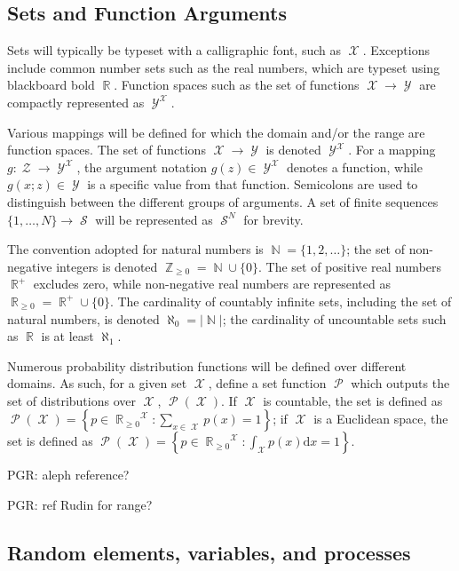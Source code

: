 \documentclass[12pt]{report}
\DeclareMathOperator{\Xcal}{\mathcal{X}}
\DeclareMathOperator{\Ycal}{\mathcal{Y}}
\DeclareMathOperator{\Zcal}{\mathcal{Z}}
\DeclareMathOperator{\Scal}{\mathcal{S}}
\DeclareMathOperator{\Pcal}{\mathcal{P}}
\DeclareMathOperator{\Rbb}{\mathbb{R}}
\DeclareMathOperator{\Nbb}{\mathbb{N}}
\DeclareMathOperator{\Zbb}{\mathbb{Z}}
\begin{document}
\subsection*{Sets and Function Arguments}

Sets will typically be typeset with a calligraphic font, such as $\Xcal$. Exceptions include common number sets such as the real numbers, which are typeset using blackboard bold $\Rbb$. Function spaces such as the set of functions $\Xcal \to \Ycal$ are compactly represented as $\Ycal^{\Xcal}$.

Various mappings will be defined for which the domain and/or the range are function spaces. The set of functions $\Xcal \to \Ycal$ is denoted $\Ycal^{\Xcal}$. For a mapping $g : \Zcal \to \Ycal^{\Xcal}$, the argument notation $g(z) \in \Ycal^{\Xcal}$ denotes a function, while $g(x;z) \in \Ycal$ is a specific value from that function. Semicolons are used to distinguish between the different groups of arguments. A set of finite sequences $\{1,\ldots,N\} \to \Scal$ will be represented as $\Scal^N$ for brevity.

The convention adopted for natural numbers is $\Nbb = \{1,2,\ldots\}$; the set of non-negative integers is denoted $\Zbb_{\geq 0} = \Nbb \cup \{0\}$. The set of positive real numbers $\Rbb^+$ excludes zero, while non-negative real numbers are represented as $\Rbb_{\geq 0} = \Rbb^+ \cup \{0\}$. The cardinality of countably infinite sets, including the set of natural numbers, is denoted $\aleph_0 = |\Nbb|$; the cardinality of uncountable sets such as $\Rbb$ is at least $\aleph_1$.

Numerous probability distribution functions will be defined over different domains. As such, for a given set $\Xcal$, define a set function $\Pcal$ which outputs the set of distributions over $\Xcal$, $\Pcal(\Xcal)$. If $\Xcal$ is countable, the set is defined as $\Pcal(\Xcal) = \left\{ p \in {\Rbb_{\geq 0}}^{\Xcal}: \sum_{x \in \Xcal} p(x) = 1 \right\}$; if $\Xcal$ is a Euclidean space, the set is defined as $\Pcal(\Xcal) = \left\{ p \in {\Rbb_{\geq 0}}^{\Xcal}: \int_{\Xcal} p(x) \mathrm{d}x = 1 \right\}$.

PGR: aleph reference?

PGR: ref Rudin for range?



\subsection*{Random elements, variables, and processes}
\end{document}
